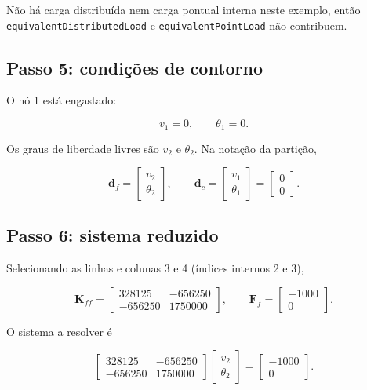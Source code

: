 \documentclass[12pt,a4paper]{article}
\begin{document}
Não há carga distribuída nem carga pontual interna neste exemplo, então \texttt{equivalentDistributedLoad} e \texttt{equivalentPointLoad} não contribuem.

\subsection{Passo 5: condições de contorno}

O nó 1 está engastado:

\begin{equation}
  v_1=0, \qquad \theta_1=0.
  \label{eq:ex_cc}
\end{equation}

Os graus de liberdade livres são \(v_2\) e \(\theta_2\). Na notação da partição,

\begin{equation}
  \mathbf{d}_f =
  \begin{bmatrix}
    v_2\\\theta_2
  \end{bmatrix},
  \qquad
  \mathbf{d}_c =
  \begin{bmatrix}
    v_1\\\theta_1
  \end{bmatrix}
  =
  \begin{bmatrix}
    0\\0
  \end{bmatrix}.
  \label{eq:ex_part}
\end{equation}

\subsection{Passo 6: sistema reduzido}

Selecionando as linhas e colunas 3 e 4 (índices internos 2 e 3),

\begin{equation}
  \mathbf{K}_{ff} =
  \begin{bmatrix}
    328125 & -656250\\
    -656250 & 1750000
  \end{bmatrix},
  \qquad
  \mathbf{F}_f =
  \begin{bmatrix}
    -1000\\0
  \end{bmatrix}.
  \label{eq:ex_reduced}
\end{equation}

O sistema a resolver é

\begin{equation}
  \begin{bmatrix}
    328125 & -656250\\
    -656250 & 1750000
  \end{bmatrix}
  \begin{bmatrix}
    v_2\\\theta_2
  \end{bmatrix}
  =
  \begin{bmatrix}
    -1000\\0
  \end{bmatrix}.
  \label{eq:ex_system}
\end{equation}
\end{document}
